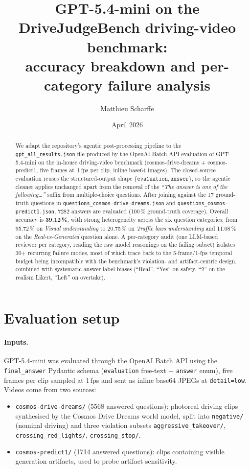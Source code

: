 \documentclass[11pt,a4paper]{article}
\title{GPT-5.4-mini on the DriveJudgeBench driving-video benchmark:\\
accuracy breakdown and per-category failure analysis}
\author{Matthieu Scharffe}
\date{April 2026}
\newcommand{\pct}[1]{#1\,\%}
\newcommand{\code}[1]{\texttt{#1}}
\begin{document}
\maketitle

\begin{abstract}
We adapt the repository's agentic post-processing pipeline to the
\code{gpt\_all\_results.json} file produced by the OpenAI Batch API
evaluation of GPT-5.4-mini on the in-house driving-video benchmark
(cosmos-drive-dreams + cosmos-predict1, five frames at~1\,fps per clip,
inline base64 images). The closed-source evaluation reuses the
structured-output shape \(\{\texttt{evaluation},\texttt{answer}\}\), so the
agentic cleaner applies unchanged apart from the removal of the
\emph{``The answer is one of the following\dots''} suffix from multiple-choice
questions. After joining against the 17 ground-truth questions in
\code{questions\_cosmos-drive-dreams.json} and
\code{questions\_cosmos-predict1.json}, \num{7282} answers are evaluated
(100\,\% ground-truth coverage). Overall accuracy is
\textbf{\pct{39.12}}, with strong heterogeneity across the six question
categories: from \pct{95.72} on \emph{Visual understanding} to
\pct{20.75} on \emph{Traffic laws understanding} and \pct{11.08} on
the \emph{Real-vs-Generated} question alone. A per-category audit
(one LLM-based reviewer per category, reading the raw model reasonings
on the failing subset) isolates 30+ recurring failure modes, most of
which trace back to the 5-frame/1-fps temporal budget being
incompatible with the benchmark's violation- and artifact-centric
design, combined with systematic answer-label biases (``Real'',
``Yes'' on safety, ``2'' on the realism Likert, ``Left'' on overtake).
\end{abstract}

\section{Evaluation setup}
\label{sec:setup}

\paragraph{Inputs.} GPT-5.4-mini was evaluated through the OpenAI
Batch API using the \code{final\_answer} Pydantic schema
(\code{evaluation} free-text + \code{answer} enum), five frames per
clip sampled at 1\,fps and sent as inline base64 JPEGs at
\code{detail=low}. Videos come from two sources:
\begin{itemize}
  \item \code{cosmos-drive-dreams/} (\num{5568} answered questions): photoreal
  driving clips synthesised by the Cosmos Drive Dreams world model,
  split into \code{negative/} (nominal driving) and three violation
  subsets \code{aggressive\_takeover/}, \code{crossing\_red\_lights/},
  \code{crossing\_stop/}.
  \item \code{cosmos-predict1/} (\num{1714} answered questions): clips
  containing visible generation artifacts, used to probe artifact
  sensitivity.
\end{itemize}
\end{document}
